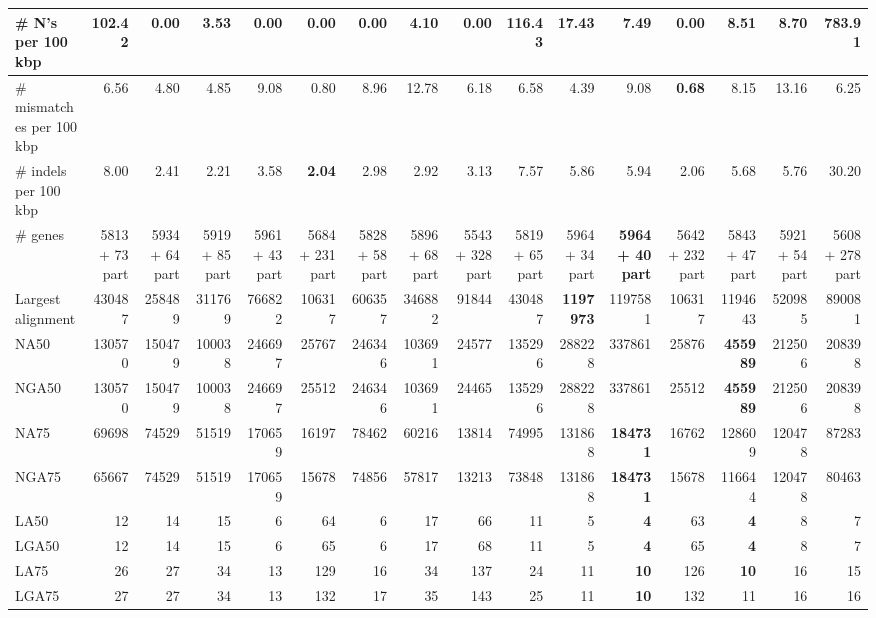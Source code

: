 \documentclass[12pt,a4paper]{article}
\begin{document}
\begin{table}[ht]
\begin{center}
\begin{tabular}{|l*{15}{|r}|}
\# N's per 100 kbp & 102.42 & {\bf 0.00} & 3.53 & {\bf 0.00} & {\bf 0.00} & {\bf 0.00} & 4.10 & {\bf 0.00} & 116.43 & 17.43 & 7.49 & {\bf 0.00} & 8.51 & 8.70 & 783.91 \\ \hline
\# mismatches per 100 kbp & 6.56 & 4.80 & 4.85 & 9.08 & 0.80 & 8.96 & 12.78 & 6.18 & 6.58 & 4.39 & 9.08 & {\bf 0.68} & 8.15 & 13.16 & 6.25 \\ \hline
\# indels per 100 kbp & 8.00 & 2.41 & 2.21 & 3.58 & {\bf 2.04} & 2.98 & 2.92 & 3.13 & 7.57 & 5.86 & 5.94 & 2.06 & 5.68 & 5.76 & 30.20 \\ \hline
\# genes & 5813 + 73 part & 5934 + 64 part & 5919 + 85 part & 5961 + 43 part & 5684 + 231 part & 5828 + 58 part & 5896 + 68 part & 5543 + 328 part & 5819 + 65 part & 5964 + 34 part & {\bf 5964 + 40 part} & 5642 + 232 part & 5843 + 47 part & 5921 + 54 part & 5608 + 278 part \\ \hline
Largest alignment & 430487 & 258489 & 311769 & 766822 & 106317 & 606357 & 346882 & 91844 & 430487 & {\bf 1197973} & 1197581 & 106317 & 1194643 & 520985 & 890081 \\ \hline
NA50 & 130570 & 150479 & 100038 & 246697 & 25767 & 246346 & 103691 & 24577 & 135296 & 288228 & 337861 & 25876 & {\bf 455989} & 212506 & 208398 \\ \hline
NGA50 & 130570 & 150479 & 100038 & 246697 & 25512 & 246346 & 103691 & 24465 & 135296 & 288228 & 337861 & 25512 & {\bf 455989} & 212506 & 208398 \\ \hline
NA75 & 69698 & 74529 & 51519 & 170659 & 16197 & 78462 & 60216 & 13814 & 74995 & 131868 & {\bf 184731} & 16762 & 128609 & 120478 & 87283 \\ \hline
NGA75 & 65667 & 74529 & 51519 & 170659 & 15678 & 74856 & 57817 & 13213 & 73848 & 131868 & {\bf 184731} & 15678 & 116644 & 120478 & 80463 \\ \hline
LA50 & 12 & 14 & 15 & 6 & 64 & 6 & 17 & 66 & 11 & 5 & {\bf 4} & 63 & {\bf 4} & 8 & 7 \\ \hline
LGA50 & 12 & 14 & 15 & 6 & 65 & 6 & 17 & 68 & 11 & 5 & {\bf 4} & 65 & {\bf 4} & 8 & 7 \\ \hline
LA75 & 26 & 27 & 34 & 13 & 129 & 16 & 34 & 137 & 24 & 11 & {\bf 10} & 126 & {\bf 10} & 16 & 15 \\ \hline
LGA75 & 27 & 27 & 34 & 13 & 132 & 17 & 35 & 143 & 25 & 11 & {\bf 10} & 132 & 11 & 16 & 16 \\ \hline
\end{tabular}
\end{center}
\end{table}
\end{document}
